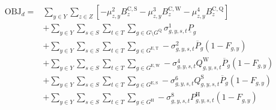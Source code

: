 \documentclass{article}
\newcommand{\sGenerators}{G}
\newcommand{\sGeneratorsExistingThermal}{G^{\mathrm{E,T}}}
\newcommand{\sGeneratorsExistingWind}{G^{\mathrm{E,W}}}
\newcommand{\sGeneratorsExistingSolar}{G^{\mathrm{E,S}}}
\newcommand{\sGeneratorsCandidateThermal}{G^{\mathrm{C,T}}}
\newcommand{\sGeneratorsCandidateWind}{G^{\mathrm{C,W}}}
\newcommand{\sGeneratorsCandidateSolar}{G^{\mathrm{C,S}}}
\newcommand{\sGeneratorsHydro}{G^{\mathrm{H}}}
\newcommand{\sStorage}{G^{\mathrm{Q}}}
\newcommand{\sYears}{Y}
\newcommand{\sScenarios}{S}
\newcommand{\sIntervals}{T}
\newcommand{\sZones}{Z}
\newcommand{\iGenerator}{g}
\newcommand{\iYear}{y}
\newcommand{\iScenario}{s}
\newcommand{\iInterval}{t}
\newcommand{\iZone}{z}
\newcommand{\cPowerOutputMax}[1][\iGenerator,\iYear]{\overline{P}_{#1}}
\newcommand{\cBuildLimitWind}{B^{\mathrm{C,\mathrm{W}}}_{\iZone}}
\newcommand{\cBuildLimitSolar}{B^{\mathrm{C,\mathrm{S}}}_{\iZone}}
\newcommand{\cBuildLimitStorage}{B^{\mathrm{C,\mathrm{Q}}}_{\iZone}}
\newcommand{\cPowerOutputMin}[1][\iGenerator]{\underline{P}_{#1}}
\newcommand{\cCapacityFactorWind}[1][\iGenerator,\iYear,\iScenario,\iInterval]{Q_{#1}^{\mathrm{W}}}
\newcommand{\cCapacityFactorSolar}[1][\iGenerator,\iYear,\iScenario,\iInterval]{Q_{#1}^{\mathrm{S}}}
\newcommand{\cRetirementIndicator}[1][\iGenerator,\iYear]{F_{#1}}
\newcommand{\cPowerOutputHydro}[1][\iGenerator,\iYear,\iScenario,\iInterval]{P^{\mathrm{H}}_{#1}}
\newcommand{\vPower}[1][\iGenerator,\iYear,\iScenario,\iInterval]{p_{#1}}
\newcommand{\vInstalledCapacityTotal}[1][\iGenerator,\iYear]{a_{#1}}
\newcommand{\dSolarBuildLimit}[1][\iZone,\iYear]{\mu_{#1}^{2}}
\newcommand{\dWindBuildLimit}[1][\iZone,\iYear]{\mu_{#1}^{3}}
\newcommand{\dStorageBuildLimit}[1][\iZone,\iYear]{\mu_{#1}^{4}}
\newcommand{\dMinPowerOutput}[1][\iGenerator,\iYear,\iScenario,\iInterval]{\sigma_{#1}^{1}}
\newcommand{\dMaxPowerOutputExistingThermal}[1][\iGenerator,\iYear,\iScenario,\iInterval]{\sigma_{#1}^{2}}
\newcommand{\dMaxPowerOutputCandidateThermal}[1][\iGenerator,\iYear,\iScenario,\iInterval]{\sigma_{#1}^{3}}
\newcommand{\dMaxPowerOutputWindExisting}[1][\iGenerator,\iYear,\iScenario,\iInterval]{\sigma_{#1}^{4}}
\newcommand{\dMaxPowerOutputWindCandidate}[1][\iGenerator,\iYear,\iScenario,\iInterval]{\sigma_{#1}^{5}}
\newcommand{\dMaxPowerOutputSolarExisting}[1][\iGenerator,\iYear,\iScenario,\iInterval]{\sigma_{#1}^{6}}
\newcommand{\dMaxPowerOutputSolarCandidate}[1][\iGenerator,\iYear,\iScenario,\iInterval]{\sigma_{#1}^{7}}
\newcommand{\dMaxPowerOutputHydro}[1][\iGenerator,\iYear,\iScenario,\iInterval]{\sigma_{#1}^{8}}
\begin{document}
\begin{align}
\begin{split}
\textrm{OBJ}_{d} =  & \sum\limits_{\iYear \in \sYears} \sum\limits_{\iZone \in \sZones} \left[- \dSolarBuildLimit \cBuildLimitSolar - \dWindBuildLimit \cBuildLimitWind - \dStorageBuildLimit \cBuildLimitStorage\right]\\
& + \sum\limits_{\iYear \in \sYears}\sum\limits_{\iScenario \in \sScenarios}\sum\limits_{\iInterval \in \sIntervals} \sum\limits_{\iGenerator \in \sGenerators \setminus \sStorage} \dMinPowerOutput \cPowerOutputMin\\
& + \sum\limits_{\iYear \in \sYears}\sum\limits_{\iScenario \in \sScenarios}\sum\limits_{\iInterval \in \sIntervals} \sum\limits_{\iGenerator \in \sGeneratorsExistingThermal} - \dMaxPowerOutputExistingThermal \cPowerOutputMax[\iGenerator] \left(1 - \cRetirementIndicator\right)\\
& + \sum\limits_{\iYear \in \sYears}\sum\limits_{\iScenario \in \sScenarios}\sum\limits_{\iInterval \in \sIntervals} \sum\limits_{\iGenerator \in \sGeneratorsExistingWind} - \dMaxPowerOutputWindExisting \cCapacityFactorWind \cPowerOutputMax[\iGenerator] \left(1 - \cRetirementIndicator\right)\\
& + \sum\limits_{\iYear \in \sYears}\sum\limits_{\iScenario \in \sScenarios}\sum\limits_{\iInterval \in \sIntervals} \sum\limits_{\iGenerator \in \sGeneratorsExistingSolar} - \dMaxPowerOutputSolarExisting \cCapacityFactorSolar \cPowerOutputMax[\iGenerator] \left(1 - \cRetirementIndicator\right)\\
& + \sum\limits_{\iYear \in \sYears}\sum\limits_{\iScenario \in \sScenarios}\sum\limits_{\iInterval \in \sIntervals} \sum\limits_{\iGenerator \in \sGeneratorsHydro} - \dMaxPowerOutputHydro \cPowerOutputHydro \left(1 - \cRetirementIndicator\right)\\

\end{split}
\end{align}
\end{document}
